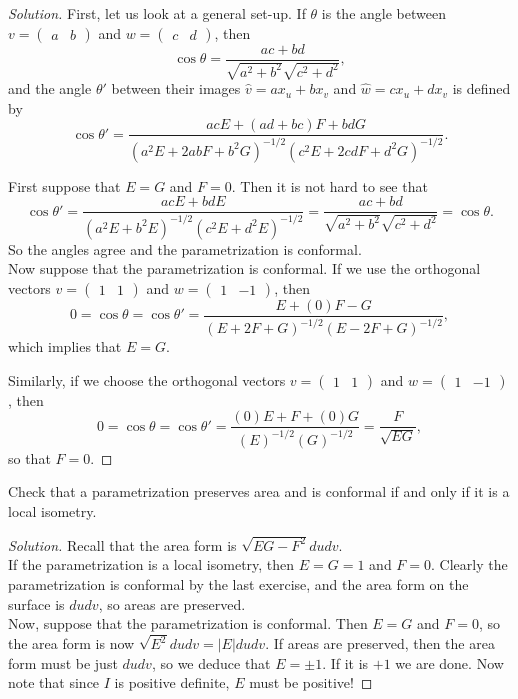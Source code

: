 \documentclass[Shifrin_Solutions_Spring_2015]{subfiles}
\begin{document}
\begin{proof}[Solution] First, let us look at a general set-up.  If $\theta$ is the angle between $v = \begin{pmatrix} a & b\end{pmatrix}$ and $w = \begin{pmatrix} c & d \end{pmatrix}$, then
\[
\cos\theta = \dfrac{ac+bd}{\sqrt{a^2+b^2}\sqrt{c^2+d^2}},
\]
and the angle $\theta'$ between their images $\hat{v} = ax_u + bx_v$ and $\hat{w} = c x_u + d x_v$ is defined by
\[
\cos \theta' = \dfrac{ac E + (ad+bc)F + bd G}{(a^2 E + 2ab F + b^2 G)^{-1/2} (c^2 E + 2cd F + d^2 G)^{-1/2} } .
\]


First suppose that $E=G$ and $F=0$. Then it is not hard to see that
\[
\cos \theta' = \dfrac{ac E +  bd E}{(a^2 E + b^2 E)^{-1/2} (c^2 E + d^2 E)^{-1/2} }  = \dfrac{ac+bd}{\sqrt{a^2+b^2}\sqrt{c^2+d^2}} = \cos\theta .
\]
So the angles agree and the parametrization is conformal.\\

Now suppose that the parametrization is conformal. If we use the orthogonal vectors $v=\begin{pmatrix} 1 & 1\end{pmatrix}$ and $w=\begin{pmatrix} 1 & -1\end{pmatrix}$, then
\[
0 = \cos\theta = \cos\theta' =\dfrac{E + (0)F - G}{( E + 2 F +  G)^{-1/2} ( E - 2 F +  G)^{-1/2} },
\]
which implies that $E=G$.

Similarly, if we choose the orthogonal vectors $v=\begin{pmatrix} 1 & 1\end{pmatrix}$ and $w=\begin{pmatrix} 1 & -1\end{pmatrix}$, then
\[
0 = \cos\theta = \cos\theta' =\dfrac{(0)E + F +(0) G}{( E )^{-1/2} (  G)^{-1/2} }= \dfrac{F}{\sqrt{EG}},
\]
so that $F=0$.
\end{proof}


\begin{exercise}
Check that a parametrization preserves area and is conformal if and only if it is a local isometry.
\end{exercise}

\begin{proof}[Solution] Recall that the area form is $\sqrt{EG-F^2}dudv$. \\

If the parametrization is a local isometry, then $E=G=1$ and $F=0$. Clearly the parametrization is conformal by the last exercise, and the area form on the surface is $dudv$, so areas are preserved. \\

Now, suppose that the parametrization is conformal. Then $E=G$ and $F=0$, so the area form is now $\sqrt{E^2}dudv = |E|dudv$. If areas are preserved, then the area form must be just $dudv$, so we deduce that $E= \pm 1$. If it is $+1$ we are done. Now note that since $I$ is positive definite, $E$ must be positive!
\end{proof}
\end{document}
